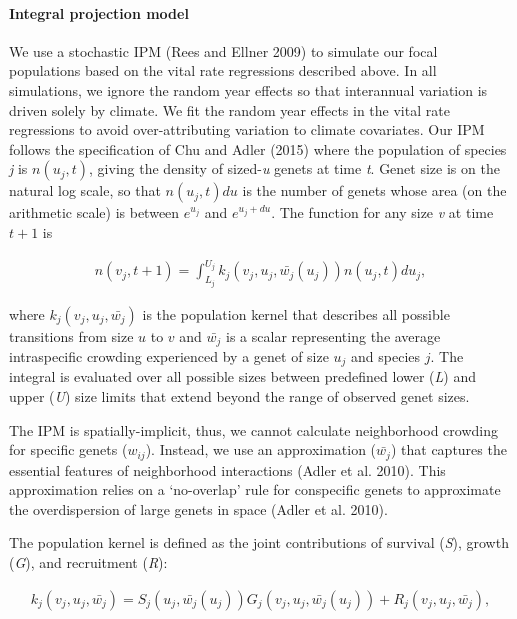 \documentclass[12pt,]{article}
\begin{document}
\paragraph{Integral projection model}\label{integral-projection-model}

We use a stochastic IPM (Rees and Ellner 2009) to simulate our focal
populations based on the vital rate regressions described above. In all
simulations, we ignore the random year effects so that interannual
variation is driven solely by climate. We fit the random year effects in
the vital rate regressions to avoid over-attributing variation to
climate covariates. Our IPM follows the specification of Chu and Adler
(2015) where the population of species \emph{j} is \(n(u_{j},t)\),
giving the density of sized-\emph{u} genets at time \emph{t}. Genet size
is on the natural log scale, so that \(n(u_{j},t)du\) is the number of
genets whose area (on the arithmetic scale) is between \(e^{u_{j}}\) and
\(e^{u_{j}+du}\). The function for any size \emph{v} at time \(t+1\) is

\vspace{-3em}\begin{align}
n(v_{j},t+1) = \int_{L_{j}}^{U_{j}} k_{j}(v_{j},u_{j},\bar{w_{j}}(u_{j}))n(u_{j},t)du_{j},
\end{align}\vspace{-3em}

where \(k_{j}(v_{j},u_{j},\bar{w_{j}})\) is the population kernel that
describes all possible transitions from size \(u\) to \(v\) and
\(\bar{w_{j}}\) is a scalar representing the average intraspecific
crowding experienced by a genet of size \(u_j\) and species \(j\). The
integral is evaluated over all possible sizes between predefined lower
(\emph{L}) and upper (\emph{U}) size limits that extend beyond the range
of observed genet sizes.

The IPM is spatially-implicit, thus, we cannot calculate neighborhood
crowding for specific genets (\(w_{ij}\)). Instead, we use an
approximation (\(\bar{w_{j}}\)) that captures the essential features of
neighborhood interactions (Adler et al. 2010). This approximation relies
on a `no-overlap' rule for conspecific genets to approximate the
overdispersion of large genets in space (Adler et al. 2010).

The population kernel is defined as the joint contributions of survival
(\emph{S}), growth (\emph{G}), and recruitment (\emph{R}):

\vspace{-3em}\begin{align}
k_{j}(v_{j},u_{j},\bar{w_{j}}) = S_j(u_j, \bar{w_{j}}(u_{j}))G_j(v_{j},u_{j},\bar{w_{j}}(u_{j})) + R_j(v_{j},u_{j},\bar{w_{j}}),
\end{align}\vspace{-3em}
\end{document}
